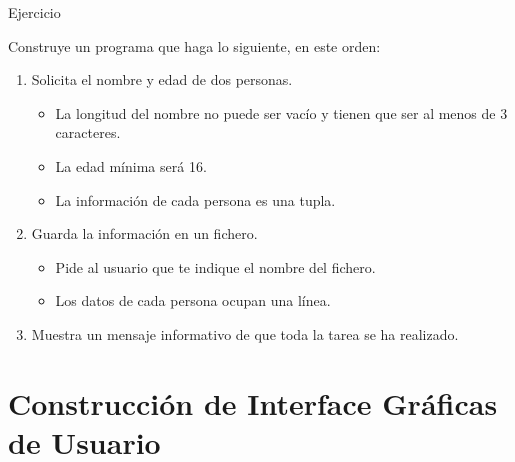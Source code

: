 \documentclass[10pt, envcountsect , spanish]{beamer}
\begin{document}
\begin{frame}{Ejercicio} 

\begin{ejercicio}{}
Construye un programa que haga lo siguiente, en este orden:

\begin{enumerate}
\item Solicita el nombre y edad de dos personas.

\begin{itemize}
\item La longitud del nombre no puede ser vacío y tienen que ser al menos de 3  caracteres. \item La edad mínima será 16.
\item La información de cada persona es una tupla.
\end{itemize}

\item Guarda la información en un fichero.

\begin{itemize}
\item Pide al usuario que te indique el nombre del fichero.
\item Los datos de cada persona ocupan una línea.
\end{itemize}

\item Muestra un mensaje informativo de que toda la tarea se ha realizado.
\end{enumerate}

\end{ejercicio}



\end{frame}







\section{Construcción de Interface Gráficas de Usuario}
\end{document}
